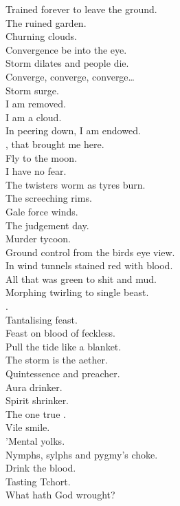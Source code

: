 Trained forever to leave the ground. \\
The ruined garden. \\
Churning clouds. \\
Convergence be into the eye. \\
Storm dilates and people die. \\

Converge, converge, converge… \\
Storm surge. \\

I am removed. \\
I am a cloud. \\
In peering down, I am endowed. \\
, that brought me here. \\
Fly to the moon. \\
I have no fear. \\

The twisters worm as tyres burn. \\
The screeching rims. \\
Gale force winds. \\
The judgement day. \\
Murder tycoon. \\
Ground control from the birds eye view. \\

In wind tunnels stained red with blood. \\
All that was green to shit and mud. \\

Morphing twirling to single beast. \\
. \\
Tantalising feast. \\

Feast on blood of feckless. \\
Pull the tide like a blanket. \\

The storm is the aether. \\
Quintessence and preacher. \\
Aura drinker. \\
Spirit shrinker. \\
The one true . \\
Vile smile. \\
'Mental yolks. \\
Nymphs, sylphs and pygmy's choke. \\
Drink the blood. \\
Tasting Tchort. \\
What hath God wrought? \\

